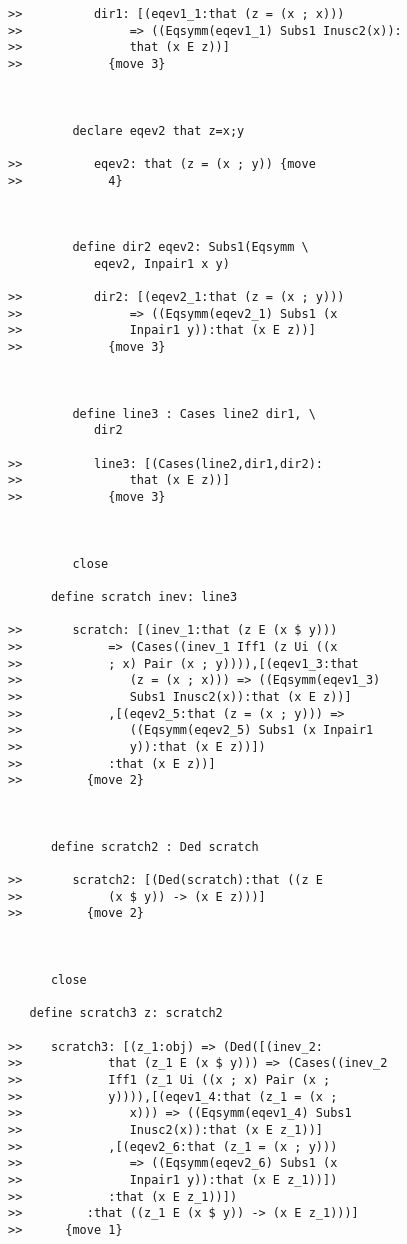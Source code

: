 \documentclass[12pt]{article}
\begin{document}
\begin{verbatim}
>>          dir1: [(eqev1_1:that (z = (x ; x)))
>>               => ((Eqsymm(eqev1_1) Subs1 Inusc2(x)):
>>               that (x E z))]
>>            {move 3}



         declare eqev2 that z=x;y

>>          eqev2: that (z = (x ; y)) {move
>>            4}



         define dir2 eqev2: Subs1(Eqsymm \
            eqev2, Inpair1 x y)

>>          dir2: [(eqev2_1:that (z = (x ; y)))
>>               => ((Eqsymm(eqev2_1) Subs1 (x
>>               Inpair1 y)):that (x E z))]
>>            {move 3}



         define line3 : Cases line2 dir1, \
            dir2

>>          line3: [(Cases(line2,dir1,dir2):
>>               that (x E z))]
>>            {move 3}



         close

      define scratch inev: line3

>>       scratch: [(inev_1:that (z E (x $ y)))
>>            => (Cases((inev_1 Iff1 (z Ui ((x
>>            ; x) Pair (x ; y)))),[(eqev1_3:that
>>               (z = (x ; x))) => ((Eqsymm(eqev1_3)
>>               Subs1 Inusc2(x)):that (x E z))]
>>            ,[(eqev2_5:that (z = (x ; y))) =>
>>               ((Eqsymm(eqev2_5) Subs1 (x Inpair1
>>               y)):that (x E z))])
>>            :that (x E z))]
>>         {move 2}



      define scratch2 : Ded scratch

>>       scratch2: [(Ded(scratch):that ((z E
>>            (x $ y)) -> (x E z)))]
>>         {move 2}



      close

   define scratch3 z: scratch2

>>    scratch3: [(z_1:obj) => (Ded([(inev_2:
>>            that (z_1 E (x $ y))) => (Cases((inev_2
>>            Iff1 (z_1 Ui ((x ; x) Pair (x ;
>>            y)))),[(eqev1_4:that (z_1 = (x ;
>>               x))) => ((Eqsymm(eqev1_4) Subs1
>>               Inusc2(x)):that (x E z_1))]
>>            ,[(eqev2_6:that (z_1 = (x ; y)))
>>               => ((Eqsymm(eqev2_6) Subs1 (x
>>               Inpair1 y)):that (x E z_1))])
>>            :that (x E z_1))])
>>         :that ((z_1 E (x $ y)) -> (x E z_1)))]
>>      {move 1}




\end{verbatim}
\end{document}

